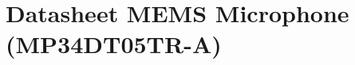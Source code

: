 \section{Datasheet MEMS Microphone (MP34DT05TR-A)} \label{appendix_datasheet_microphone}
\enlargethispage{2.5cm}
\begin{adjustwidth}{0.23cm}{0cm} \hfuzz=7.0pt \vfuzz=19.0pt
\end{adjustwidth}
\newpage



